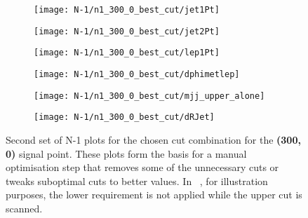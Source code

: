 \begin{figure}
	\centering
	\begin{subfigure}[b]{0.5\linewidth}
		\centering\texttt{[image: N-1/n1\_300\_0\_best\_cut/jet1Pt]}
		\caption{\label{fig:result_300_0_jet1Pt}}
	\end{subfigure}%
	\begin{subfigure}[b]{0.5\linewidth}
		\centering\texttt{[image: N-1/n1\_300\_0\_best\_cut/jet2Pt]}
		\caption{\label{fig:result_300_0_jet2Pt}}
	\end{subfigure}	
	\begin{subfigure}[b]{0.5\linewidth}
		\centering\texttt{[image: N-1/n1\_300\_0\_best\_cut/lep1Pt]}
		\caption{\label{fig:result_300_0_lep1Pt}}
	\end{subfigure}%
	\begin{subfigure}[b]{0.5\linewidth}
		\centering\texttt{[image: N-1/n1\_300\_0\_best\_cut/dphimetlep]}
		\caption{\label{fig:result_300_0_dphimetlep}}
	\end{subfigure}
	\begin{subfigure}[b]{0.5\linewidth}
		\centering\texttt{[image: N-1/n1\_300\_0\_best\_cut/mjj\_upper\_alone]}
		\caption{\label{fig:result_300_0_mjj_upper}}
	\end{subfigure}%
	\begin{subfigure}[b]{0.5\linewidth}
		\centering\texttt{[image: N-1/n1\_300\_0\_best\_cut/dRJet]}
		\caption{\label{fig:result_300_0_dRJet}}
	\end{subfigure}
	\caption[N-1 plots for the chosen cut combination for the (300,0) signal point, 2/2]{Second set of N-1 plots for the chosen cut combination for the \textbf{(300, 0)} signal point. These plots form the basis for a manual optimisation step that removes some of the unnecessary cuts or tweaks suboptimal cuts to better values. In \figname~, for illustration purposes, the lower requirement is not applied while the upper cut is scanned.}
	\label{fig:results_300_0_n-1}
\end{figure}

